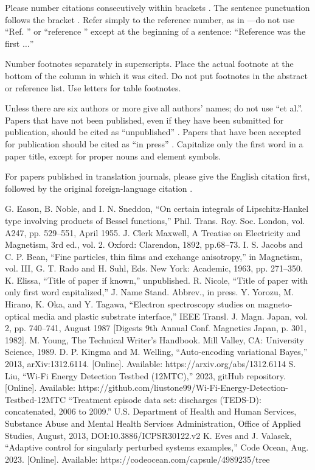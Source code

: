 \documentclass[conference]{IEEEtran}
\begin{document}
Please number citations consecutively within brackets \cite{b1}. The 
sentence punctuation follows the bracket \cite{b2}. Refer simply to the reference 
number, as in \cite{b3}---do not use ``Ref. \cite{b3}'' or ``reference \cite{b3}'' except at 
the beginning of a sentence: ``Reference \cite{b3} was the first $\ldots$''

Number footnotes separately in superscripts. Place the actual footnote at 
the bottom of the column in which it was cited. Do not put footnotes in the 
abstract or reference list. Use letters for table footnotes.

Unless there are six authors or more give all authors' names; do not use 
``et al.''. Papers that have not been published, even if they have been 
submitted for publication, should be cited as ``unpublished'' \cite{b4}. Papers 
that have been accepted for publication should be cited as ``in press'' \cite{b5}. 
Capitalize only the first word in a paper title, except for proper nouns and 
element symbols.

For papers published in translation journals, please give the English 
citation first, followed by the original foreign-language citation \cite{b6}.

\begin{thebibliography}{00}
 G. Eason, B. Noble, and I. N. Sneddon, ``On certain integrals of Lipschitz-Hankel type involving products of Bessel functions,'' Phil. Trans. Roy. Soc. London, vol. A247, pp. 529--551, April 1955.
 J. Clerk Maxwell, A Treatise on Electricity and Magnetism, 3rd ed., vol. 2. Oxford: Clarendon, 1892, pp.68--73.
 I. S. Jacobs and C. P. Bean, ``Fine particles, thin films and exchange anisotropy,'' in Magnetism, vol. III, G. T. Rado and H. Suhl, Eds. New York: Academic, 1963, pp. 271--350.
 K. Elissa, ``Title of paper if known,'' unpublished.
 R. Nicole, ``Title of paper with only first word capitalized,'' J. Name Stand. Abbrev., in press.
 Y. Yorozu, M. Hirano, K. Oka, and Y. Tagawa, ``Electron spectroscopy studies on magneto-optical media and plastic substrate interface,'' IEEE Transl. J. Magn. Japan, vol. 2, pp. 740--741, August 1987 [Digests 9th Annual Conf. Magnetics Japan, p. 301, 1982].
 M. Young, The Technical Writer's Handbook. Mill Valley, CA: University Science, 1989.
 D. P. Kingma and M. Welling, ``Auto-encoding variational Bayes,'' 2013, arXiv:1312.6114. [Online]. Available: https://arxiv.org/abs/1312.6114
 S. Liu, ``Wi-Fi Energy Detection Testbed (12MTC),'' 2023, gitHub repository. [Online]. Available: https://github.com/liustone99/Wi-Fi-Energy-Detection-Testbed-12MTC
 ``Treatment episode data set: discharges (TEDS-D): concatenated, 2006 to 2009.'' U.S. Department of Health and Human Services, Substance Abuse and Mental Health Services Administration, Office of Applied Studies, August, 2013, DOI:10.3886/ICPSR30122.v2
 K. Eves and J. Valasek, ``Adaptive control for singularly perturbed systems examples,'' Code Ocean, Aug. 2023. [Online]. Available: https://codeocean.com/capsule/4989235/tree
\end{thebibliography}
\end{document}
